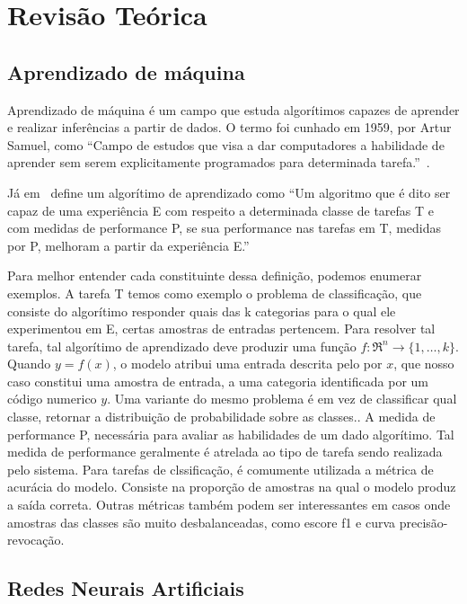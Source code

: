 \section{Revisão Teórica}\label{sec:Cap2_revisao_teorica}

\subsection{Aprendizado de máquina}\label{sec:aprendizado_maquina}

Aprendizado de máquina é um campo que estuda algorítimos capazes de aprender e realizar inferências a partir de dados. O termo foi cunhado em 1959, por Artur Samuel, como “Campo de estudos que visa a dar computadores a habilidade de aprender sem serem explicitamente programados para determinada tarefa.”~\cite{Samuel1959SomeSI}.

Já em~\cite{Mitchell97} define um algorítimo de aprendizado como “Um algoritmo que é dito ser capaz de uma experiência E com respeito a determinada classe de tarefas T e com medidas de performance P, se sua performance nas tarefas em T, medidas por P, melhoram a partir da experiência E.”

Para melhor entender cada constituinte dessa definição, podemos enumerar exemplos. A
tarefa T temos como exemplo o problema de classificação, que consiste do algorítimo
responder quais das k categorias para o qual ele experimentou em E, certas amostras de entradas pertencem. Para resolver tal tarefa, tal algorítimo de aprendizado deve produzir uma função $f:\Re^n\rightarrow \{1,\ldots,k\}$. Quando $y=f(x)$, o modelo atribui uma entrada descrita pelo por $x$, que nosso caso constitui uma amostra de entrada, a uma categoria identificada por um código numerico $y$. Uma variante do mesmo problema é em vez de classificar qual classe, retornar a distribuição de probabilidade sobre as classes.\cite{GoodBengCour16}. A medida de performance P, necessária para avaliar as habilidades de um dado algorítimo. Tal medida de performance geralmente é atrelada ao tipo de tarefa sendo realizada pelo sistema. Para tarefas de clssificação, é comumente utilizada a métrica de acurácia do modelo. Consiste na proporção de amostras na qual o modelo produz a saída correta. Outras métricas também podem ser interessantes em casos onde amostras das classes são muito desbalanceadas, como escore f1 e curva precisão-revocação.


\subsection{Redes Neurais Artificiais}\label{sec:Cap2_redes_neurais}

